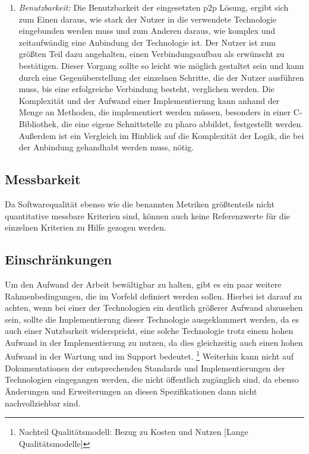 \begin{enumerate}
    	\item {\it Benutzbarkeit:}
    	Die Benutzbarkeit der eingesetzten p2p Lösung, ergibt sich zum Einen daraus, wie stark der Nutzer in die verwendete Technologie eingebunden werden muss und zum Anderen daraus, wie komplex und zeitaufwändig eine Anbindung der Technologie ist.
    	Der Nutzer ist zum größten Teil dazu angehalten, einen Verbindungsaufbau als erwünscht zu bestätigen. Dieser Vorgang sollte so leicht wie möglich gestaltet sein und kann durch eine Gegenüberstellung der einzelnen Schritte, die der Nutzer ausführen muss, bis eine erfolgreiche Verbindung besteht, verglichen werden.
    	Die Komplexität und der Aufwand einer Implementierung kann anhand der Menge an Methoden, die implementiert werden müssen, besonders in einer C-Bibliothek, die eine eigene Schnittstelle zu pharo abbildet, festgestellt werden. Außerdem ist ein Vergleich im Hinblick auf die Komplexität der Logik, die bei der Anbindung gehandhabt werden muss, nötig.
    	\end{enumerate}
    		\subsection{Messbarkeit}
		Da Softwarequalität ebenso wie die benannten Metriken größtenteils nicht quantitative messbare Kriterien sind, können auch keine Referenzwerte für die einzelnen Kriterien zu Hilfe gezogen werden.
		\subsection{Einschränkungen}
		Um den Aufwand der Arbeit bewältigbar zu halten, gibt es ein paar weitere Rahmenbedingungen, die im Vorfeld definiert werden sollen. Hierbei ist darauf zu achten, wenn bei einer der Technologien ein deutlich größerer Aufwand abzusehen sein, sollte die Implementierung dieser Technologie ausgeklammert werden, da es auch einer Nutzbarkeit widerspricht, eine solche Technologie trotz einem hohen Aufwand in der Implementierung zu nutzen, da dies gleichzeitig auch einen hohen Aufwand in der Wartung und im Support bedeutet. \footnote{Nachteil Qualitätsmodell: Bezug zu Kosten und Nutzen [Lange Qualitätsmodelle]}
		Weiterhin kann nicht auf Dokumentationen der entsprechenden Standards und Implementierungen der Technologien eingegangen werden, die nicht öffentlich zugänglich sind, da ebenso Änderungen und Erweiterungen an diesen Spezifikationen dann nicht nachvollziehbar sind.
